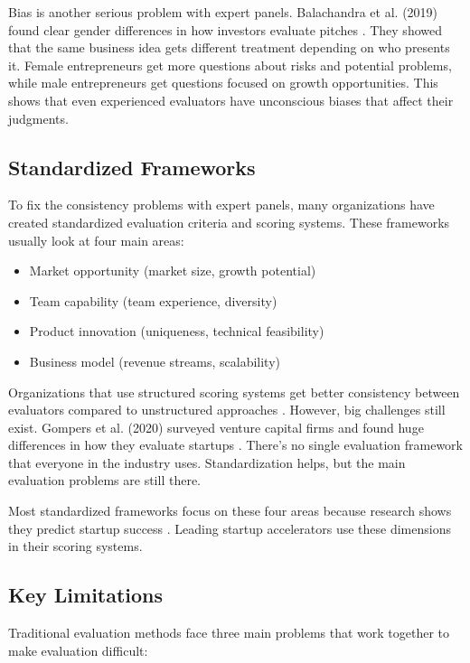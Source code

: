Bias is another serious problem with expert panels. Balachandra et al. (2019) found clear gender differences in how investors evaluate pitches \cite{Balachandra2019}. They showed that the same business idea gets different treatment depending on who presents it. Female entrepreneurs get more questions about risks and potential problems, while male entrepreneurs get questions focused on growth opportunities. This shows that even experienced evaluators have unconscious biases that affect their judgments.

\subsection{Standardized Frameworks}\label{subsec:standardized-frameworks}
To fix the consistency problems with expert panels, many organizations have created standardized evaluation criteria and scoring systems. These frameworks usually look at four main areas:
\begin{itemize}
    \item Market opportunity (market size, growth potential)
    \item Team capability (team experience, diversity)
    \item Product innovation (uniqueness, technical feasibility)
    \item Business model (revenue streams, scalability)
\end{itemize}

Organizations that use structured scoring systems get better consistency between evaluators compared to unstructured approaches \cite{Tsay2021VISUALSDI}. However, big challenges still exist. Gompers et al. (2020) surveyed venture capital firms and found huge differences in how they evaluate startups \cite{Gompers2020}. There's no single evaluation framework that everyone in the industry uses. Standardization helps, but the main evaluation problems are still there.

Most standardized frameworks focus on these four areas because research shows they predict startup success \cite{Kalvapalle2024}. Leading startup accelerators use these dimensions in their scoring systems.

\subsection{Key Limitations}\label{subsec:key-limitations}
Traditional evaluation methods face three main problems that work together to make evaluation difficult:

